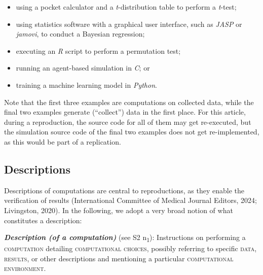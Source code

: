 \documentclass[authordate, meta]{jote-new-article}
\begin{document}
	\begin{itemize}


		\item using a pocket calculator and a \emph{t}-distribution table to perform a \emph{t}-test;



		\item using statistics software with a graphical user interface, such as \emph{JASP} or \emph{jamovi}, to conduct a Bayesian regression;



		\item executing an \emph{R} script to perform a permutation test;



		\item running an agent-based simulation in \emph{C}; or



		\item training a machine learning model in \emph{Python}.


	\end{itemize}

	Note that the first three examples are computations on collected data, while the final two examples generate (“collect”) data in the first place. For this article, during a reproduction, the source code for all of them may get re-executed, but the simulation source code of the final two examples does not get re-implemented, as this would be part of a replication.



	\subsection{Descriptions}



	Descriptions of computations are central to reproductions, as they enable the verification of results (International Committee of Medical Journal Editors, 2024; Livingston, 2020). In the following, we adopt a very broad notion of what constitutes a description:

	\vspace{\topsep}
	\noindent\emph{\textbf{Description (of a computation)}} (see S2 \rightarrow{ }n\textsubscript{1}): Instructions on performing a \textsc{computation} detailing \textsc{computational choices}, possibly referring to specific \textsc{data}, \textsc{results}, or other descriptions and mentioning a particular \textsc{computational environment}.
\end{document}
